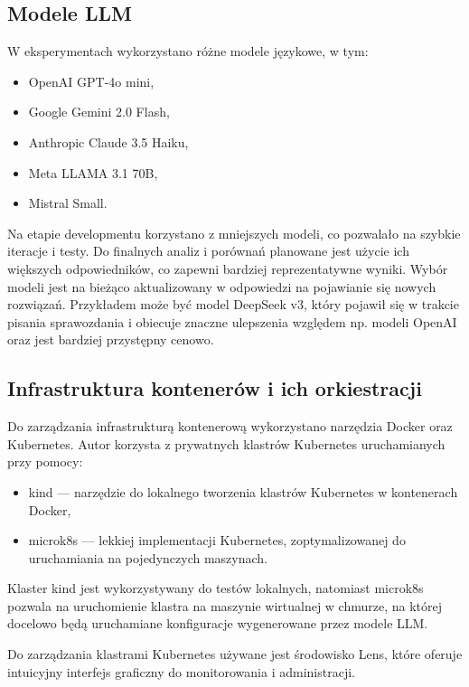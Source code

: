 \subsection{Modele LLM}

W eksperymentach wykorzystano różne modele językowe, w tym:

\begin{itemize}
    \item OpenAI GPT-4o mini,
    \item Google Gemini 2.0 Flash,
    \item Anthropic Claude 3.5 Haiku,
    \item Meta LLAMA 3.1 70B,
    \item Mistral Small.
\end{itemize}

Na etapie developmentu korzystano z mniejszych modeli, co pozwalało na szybkie iteracje i testy. Do finalnych analiz i porównań planowane jest użycie ich większych odpowiedników, co zapewni bardziej reprezentatywne wyniki. Wybór modeli jest na bieżąco aktualizowany w odpowiedzi na pojawianie się nowych rozwiązań. Przykładem może być model DeepSeek v3, który pojawił się w trakcie pisania sprawozdania i obiecuje znaczne ulepszenia względem np. modeli OpenAI oraz jest bardziej przystępny cenowo.

\subsection{Infrastruktura kontenerów i ich orkiestracji}

Do zarządzania infrastrukturą kontenerową wykorzystano narzędzia Docker oraz Kubernetes. Autor korzysta z prywatnych klastrów Kubernetes uruchamianych przy pomocy:

\begin{itemize}
    \item kind — narzędzie do lokalnego tworzenia klastrów Kubernetes w kontenerach Docker,
    \item microk8s — lekkiej implementacji Kubernetes, zoptymalizowanej do uruchamiania na pojedynczych maszynach.
\end{itemize}

Klaster kind jest wykorzystywany do testów lokalnych, natomiast microk8s pozwala na uruchomienie klastra na maszynie wirtualnej w chmurze, na której docelowo będą uruchamiane konfiguracje wygenerowane przez modele LLM.

Do zarządzania klastrami Kubernetes używane jest środowisko Lens, które oferuje intuicyjny interfejs graficzny do monitorowania i administracji.

